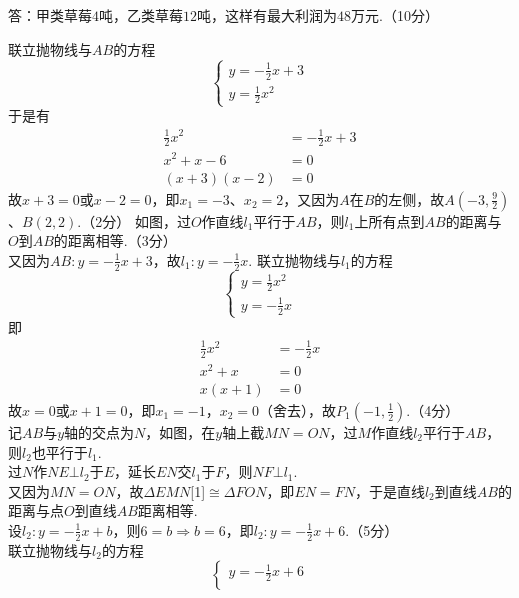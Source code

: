 \documentclass[10pt]{article}
\begin{document}
\begin{questions}{\answeringintroduction}
\begin{subquestions}
        答：甲类草莓$4$吨，乙类草莓$12$吨，这样有最大利润为$48$万元.（10分）
    \end{subquestions}
    \question %
    \begin{subquestions}
        \subquestion 联立抛物线与$AB$的方程
        $$\begin{cases}
            y = -\frac{1}{2}x+3 \\
            y = \frac{1}{2}x^2
        \end{cases}$$
        于是有
        $$\begin{aligned}
            \frac{1}{2}x^2 &= -\frac{1}{2}x+3 \\
            x^2+x-6 &= 0 \\
            (x+3)(x-2) &= 0
        \end{aligned}$$
        故$x+3=0$或$x-2=0$，即$x_1=-3$、$x_2=2$，又因为$A$在$B$的左侧，故$A\left(-3,\frac{9}{2}\right)$、$B(2,2)$.（2分）
        \subquestion 如图，过$O$作直线$l_1$平行于$AB$，则$l_1$上所有点到$AB$的距离与$O$到$AB$的距离相等.（3分）\\
        又因为$AB:y=-\frac{1}{2}x+3$，故$l_1:y=-\frac{1}{2}x$.
        联立抛物线与$l_1$的方程
        $$\begin{cases}
            y=\frac{1}{2}x^2 \\
            y=-\frac{1}{2}x
        \end{cases}$$
        即
        $$\begin{aligned}
            \frac{1}{2}x^2 &= -\frac{1}{2}x \\
            x^2+x &= 0 \\
            x(x+1) &= 0
        \end{aligned}$$
        故$x=0$或$x+1=0$，即$x_1=-1$，$x_2=0$（舍去），故$P_1\left(-1,\frac{1}{2}\right)$.（4分） \\
        记$AB$与$y$轴的交点为$N$，如图，在$y$轴上截$MN=ON$，过$M$作直线$l_2$平行于$AB$，则$l_2$也平行于$l_1$. \\
        过$N$作$NE \bot l_2$于$E$，延长$EN$交$l_1$于$F$，则$NF \bot l_1$. \\
        又因为$MN=ON$，故$\Delta EMN$\scalebox{-1}[1]{$\cong$}$\Delta FON$，即$EN=FN$，于是直线$l_2$到直线$AB$的距离与点$O$到直线$AB$距离相等.\\
        设$l_2:y=-\frac{1}{2}x+b$，则$6=b \Rightarrow b=6$，即$l_2:y=-\frac{1}{2}x+6$.（5分） \\
        联立抛物线与$l_2$的方程
        $$\begin{cases}
            y=-\frac{1}{2}x+6 \\

\end{cases}$$
\end{subquestions}
\end{questions}
\end{document}
